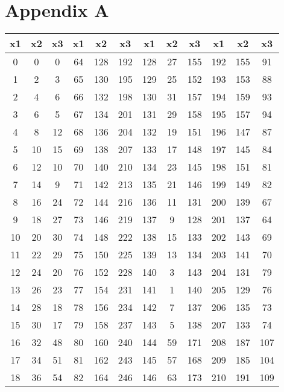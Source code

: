 \chapter{Appendix A}
\label{ch:appendixa}

\begin{longtable}{ccc|ccc|ccc|ccc}
  x1 & x2  & x3  & x1  & x2  & x3  & x1  & x2  & x3  & x1  & x2  & x3  \\ \hline
  0  & 0   & 0   & 64  & 128 & 192 & 128 & 27  & 155 & 192 & 155 & 91  \\
  1  & 2   & 3   & 65  & 130 & 195 & 129 & 25  & 152 & 193 & 153 & 88  \\
  2  & 4   & 6   & 66  & 132 & 198 & 130 & 31  & 157 & 194 & 159 & 93  \\
  3  & 6   & 5   & 67  & 134 & 201 & 131 & 29  & 158 & 195 & 157 & 94  \\
  4  & 8   & 12  & 68  & 136 & 204 & 132 & 19  & 151 & 196 & 147 & 87  \\
  5  & 10  & 15  & 69  & 138 & 207 & 133 & 17  & 148 & 197 & 145 & 84  \\
  6  & 12  & 10  & 70  & 140 & 210 & 134 & 23  & 145 & 198 & 151 & 81  \\
  7  & 14  & 9   & 71  & 142 & 213 & 135 & 21  & 146 & 199 & 149 & 82  \\
  8  & 16  & 24  & 72  & 144 & 216 & 136 & 11  & 131 & 200 & 139 & 67  \\
  9  & 18  & 27  & 73  & 146 & 219 & 137 & 9   & 128 & 201 & 137 & 64  \\
  10 & 20  & 30  & 74  & 148 & 222 & 138 & 15  & 133 & 202 & 143 & 69  \\
  11 & 22  & 29  & 75  & 150 & 225 & 139 & 13  & 134 & 203 & 141 & 70  \\
  12 & 24  & 20  & 76  & 152 & 228 & 140 & 3   & 143 & 204 & 131 & 79  \\
  13 & 26  & 23  & 77  & 154 & 231 & 141 & 1   & 140 & 205 & 129 & 76  \\
  14 & 28  & 18  & 78  & 156 & 234 & 142 & 7   & 137 & 206 & 135 & 73  \\
  15 & 30  & 17  & 79  & 158 & 237 & 143 & 5   & 138 & 207 & 133 & 74  \\
  16 & 32  & 48  & 80  & 160 & 240 & 144 & 59  & 171 & 208 & 187 & 107 \\
  17 & 34  & 51  & 81  & 162 & 243 & 145 & 57  & 168 & 209 & 185 & 104 \\
  18 & 36  & 54  & 82  & 164 & 246 & 146 & 63  & 173 & 210 & 191 & 109 \\

\end{longtable}
